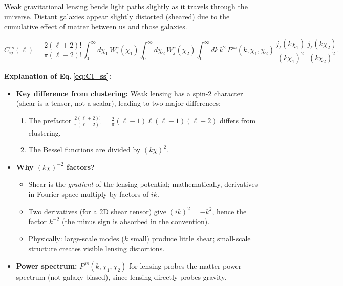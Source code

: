 Weak gravitational lensing bends light paths slightly as it travels through the universe. Distant galaxies appear slightly distorted (sheared) due to the cumulative effect of matter between us and those galaxies.

\begin{equation}
    C^{ss}_{ij}(\ell) = \frac{2(\ell+2)!}{\pi(\ell-2)!}
    \int_0^\infty d\chi_1\, W^s_i(\chi_1)
    \int_0^\infty d\chi_2\, W^s_j(\chi_2)
    \int_0^\infty dk\, k^2\, P^{ss}(k,\chi_1,\chi_2)\,
    \frac{j_\ell(k\chi_1)}{(k\chi_1)^2}\,
    \frac{j_\ell(k\chi_2)}{(k\chi_2)^2}.
    \label{eq:Cl_ss}
\end{equation}

\noindent\textbf{\large Explanation of Eq.\,\eqref{eq:Cl_ss}:}\\

\begin{itemize}[leftmargin=1.5cm]
    \item \textbf{Key difference from clustering:} Weak lensing has a spin-2 character (shear is a tensor, not a scalar), leading to two major differences:
    \begin{enumerate}
        \item The prefactor $\frac{2(\ell+2)!}{\pi(\ell-2)!} = \frac{2}{\pi} (\ell-1)\ell(\ell+1)(\ell+2)$ differs from clustering.
        \item The Bessel functions are divided by $(k\chi)^2$.
    \end{enumerate}

    \item \textbf{Why $(k\chi)^{-2}$ factors?}
    \begin{itemize}
        \item Shear is the \emph{gradient} of the lensing potential; mathematically, derivatives in Fourier space multiply by factors of $ik$.
        \item Two derivatives (for a 2D shear tensor) give $(ik)^2 = -k^2$, hence the factor $k^{-2}$ (the minus sign is absorbed in the convention).
        \item Physically: large-scale modes ($k$ small) produce little shear; small-scale structure creates visible lensing distortions.
    \end{itemize}

    \item \textbf{Power spectrum:} $P^{ss}(k,\chi_1,\chi_2)$ for lensing probes the matter power spectrum (not galaxy-biased), since lensing directly probes gravity.
\end{itemize}

